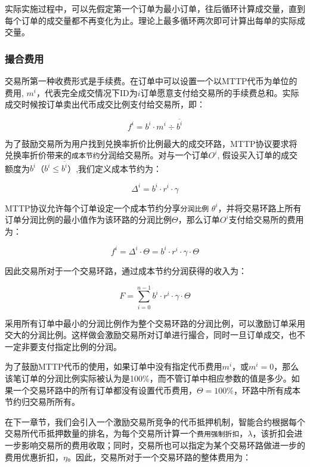 \documentclass[UTF8,nofonts]{ctexart}
\begin{document}
实际实施过程中，可以先假定第一个订单为最小订单，往后循环计算成交量，直到每个订单的成交量都不再变化为止。理论上最多循环两次即可计算出每单的实际成交量。

\subsubsection{撮合费用\label{sec:fee}}

交易所第一种收费形式是手续费。在订单中可以设置一个以MTTP代币为单位的费用, $m^i$，代表完全成交情况下ID为$i$订单愿意支付给交易所的手续费总和。实际成交时候按订单卖出代币成交比例支付给交易所，即：

\begin{equation*}
f^i = b^i \cdot m^i  \div \overline{b^i}
\end{equation*}


为了鼓励交易所为用户找到兑换率折价比例最大的成交环路，MTTP协议要求将兑换率折价带来的\texttt{成本节约}分润给交易所。对与一个订单$O^i$, 假设买入订单的成交额度为$b^i$（$b^i \le \overline{b^i}$）,我们定义成本节约为：

\begin{equation*}
\Delta^i = b^i \cdot r^i \cdot \gamma
\end{equation*}

MTTP协议允许每个订单设定一个成本节约分享\texttt{分润比例} $\theta^i$，并将交易环路上所有订单分润比例的最小值作为该环路的分润比例$\Theta$，那么订单$O^i$支付给交易所的费用为：

\begin{equation*}
f^i = \Delta^i \cdot \Theta = b^i \cdot r^i \cdot \gamma \cdot \Theta
\end{equation*}

因此交易所对于一个交易环路，通过成本节约分润获得的收入为：

\begin{equation*}
F = \sum^{n-1}_{i=0} b^i \cdot r^i \cdot \gamma \cdot \Theta
\end{equation*}

采用所有订单中最小的分润比例作为整个交易环路的分润比例，可以激励订单采用交大的分润比例。这样做会激励交易所对订单进行撮合，同时一旦订单成交，也不一定非要支付指定比例的分润。


为了鼓励MTTP代币的使用，如果订单中没有指定代币费用$m^i$，或$m^i=0$，那么该笔订单的分润比例实际被认为是100\%，而不管订单中相应参数的值是多少。如果一个交易环路中的所有订单都没有设置代币费用，$\Theta=100\%$，环路中所有成本节约归交易所所有。

在下一章节，我们会引入一个激励交易所竞争的代币抵押机制，智能合约根据每个交易所代币抵押数量的排名，为每个交易所计算一个\texttt{费用强制折扣}，$\lambda$，该折扣会进一步影响交易所的费用收取；同时，交易所也可以指定为某个交易环路做进一步的费用优惠折扣，$\eta$。因此，交易所对于一个交易环路的整体费用为：
\end{document}
